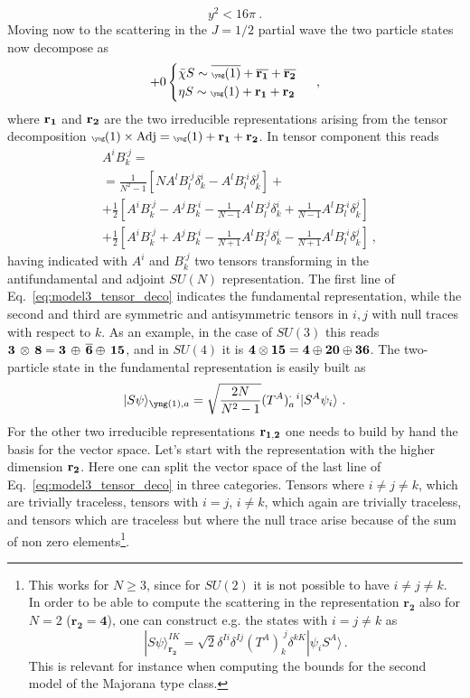 \documentclass[a4paper,11pt]{article}
\newcommand{\be}{\begin{equation}}
\newcommand{\ee}{\end{equation}}
\newcommand{\nn}{\nonumber}
\begin{document}
\be
y^2 <16 \pi \ .
\ee
Moving now to the scattering in the $J=1/2$ partial wave the two particle states now decompose as
\be
+0
\begin{cases}
 \bar\chi S  \sim {\overline{{\tiny{\yng(1)}}}} + {\overline{\bf r_1}} + {\overline{\bf r_2}} \nn \\
 \eta S \sim {\tiny{\yng(1)}} + {\bf r_1} + {\bf r_2}
\end{cases}  \ ,
\ee
where ${\bf r_1}$ and ${\bf r_2}$ are the two irreducible representations arising from the tensor decomposition ${\tiny{\yng(1)}} \times {\rm Adj} = {\tiny{\yng(1)}} + {\bf r_1}+{\bf r_2}$. In tensor component this reads
\begin{align}
& A^i B_k^{\cdot j}  =\nn \\
& = \frac{1}{N^2-1}\left[N A^l B_l^{\cdot j} \delta_k^i - A^l B_l^{\cdot i}\delta_k^j  \right] + \nn \\
& + \frac{1}{2}\left[ A^i B_k^{\cdot j}- A^j B_k^{\cdot i}-\frac{1}{N-1}A^l B_l^{\cdot j}\delta_k^i +\frac{1}{N-1}A^l B_l^{\cdot i} \delta_k^j\right] \nn \\
& + \frac{1}{2}\left[ A^i B_k^{\cdot j}+ A^j B_k^{\cdot i}-\frac{1}{N+1}A^l B_l^{\cdot j}\delta_k^i -\frac{1}{N+1}A^l B_l^{\cdot i} \delta_k^j\right]  \ ,
\label{eq:model3_tensor_deco}
\end{align}
having indicated with $A^i$ and $B_k^{\cdot j}$ two tensors transforming in the antifundamental and adjoint $SU(N)$ representation. The first line of Eq.~\eqref{eq:model3_tensor_deco} indicates the fundamental representation, while the second and third are symmetric and antisymmetric tensors in $i,j$ with null traces with respect to $k$.
 As an example, in the case of $SU(3)$ this reads ${\bf 3}\,\otimes\, {\bf 8}= {\bf 3}\,\oplus\,{\overline{\bf 6}} \oplus\, {\bf{15}}$, and in $SU(4)$ it is ${\bf 4}\otimes {\bf 15}= {\bf 4}\oplus{{\bf 20}} \oplus {\bf{36}}$. The two-particle state in the fundamental representation is easily built as
\be\label{eq:r0}
|S\psi \rangle_{{\tiny{\yng(1)}},a} =\sqrt{\frac{2N}{N^2-1}}  (T^A)_a^{\cdot~i} |S^A \psi_i \rangle  \ .
\ee
For the other two irreducible representations ${\bf r_{1,2}}$ one needs to build by hand the basis for the vector space. Let's start with the representation with the higher dimension ${\bf r_2}$. Here one can split the vector space of the last line of Eq.~\eqref{eq:model3_tensor_deco} in three categories. Tensors where $i\ne j \ne k$, which are  trivially traceless, tensors with $i= j$, $i\ne k$, which again are trivially traceless, and tensors which are traceless but where the null trace arise because of the sum of non zero elements\footnote{This works for $N\ge 3$, since for $SU(2)$ it is not possible to have $i\ne j \neq k$. In order to be able to compute the scattering in the representation $\mathbf{r_2}$ also for $N=2$ ($\mathbf{r_2} = \mathbf{4}$), one can construct e.g. the states with $i = j \neq k$ as
\be
	| S \psi \rangle ^{IK}_{\mathbf{r_2}} = \sqrt{2} \delta^{Ii}\delta^{Ij} (T^A)^{\;j}_k \delta^{kK} | \psi_i S^A \rangle \,.
\ee
This is relevant for instance when computing the bounds for the second model of the Majorana type class.}. 
\end{document}
